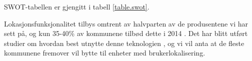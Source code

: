 SWOT-tabellen er gjengitt i tabell \vref{table.swot}.

Lokasjonsfunksjonalitet tilbys omtrent av halvparten av de produsentene vi har
sett på, og kun 35-40\%{} av kommunene tilbød dette i 2014
\cite{org.alarmmottak}.  Det har blitt utført studier om hvordan best utnytte
denne teknologien \cite{sintef.trygge.spor}, og vi vil anta at de fleste
kommunene fremover vil bytte til enheter med brukerlokalisering.




